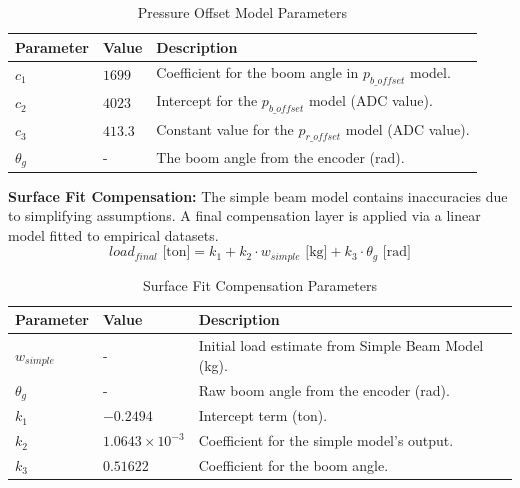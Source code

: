 \documentclass[12pt, a4paper]{article}
\begin{document}
\begin{table}[H]
    \centering
    \caption{Pressure Offset Model Parameters}
    \begin{tabular}{l|l|l}
        \hline
        \textbf{Parameter} & \textbf{Value} & \textbf{Description} \\
        \hline
        $c_1$ & $1699$ & Coefficient for the boom angle in $p_{b\_offset}$ model. \\
        $c_2$ & $4023$ & Intercept for the $p_{b\_offset}$ model (ADC value). \\
        $c_3$ & $413.3$ & Constant value for the $p_{r\_offset}$ model (ADC value). \\
        $\theta_g$ & - & The boom angle from the encoder (rad). \\
        \hline
    \end{tabular}
\end{table}

\textbf{Surface Fit Compensation:}
The simple beam model contains inaccuracies due to simplifying assumptions. A final compensation layer is applied via a linear model fitted to empirical datasets.
\begin{equation}
    load_{final} \text{ [ton]} = k_1 + k_2 \cdot w_{simple} \text{ [kg]} + k_3 \cdot \theta_g \text{ [rad]}
\end{equation}

\begin{table}[H]
    \centering
    \caption{Surface Fit Compensation Parameters}
    \begin{tabular}{l|l|l}
        \hline
        \textbf{Parameter} & \textbf{Value} & \textbf{Description} \\
        \hline
        $w_{simple}$ & - & Initial load estimate from Simple Beam Model (kg). \\
        $\theta_g$ & - & Raw boom angle from the encoder (rad). \\
        $k_1$ & $-0.2494$ & Intercept term (ton). \\
        $k_2$ & $1.0643 \times 10^{-3}$ & Coefficient for the simple model's output. \\
        $k_3$ & $0.51622$ & Coefficient for the boom angle. \\
        \hline
    \end{tabular}
\end{table}

\end{document}
